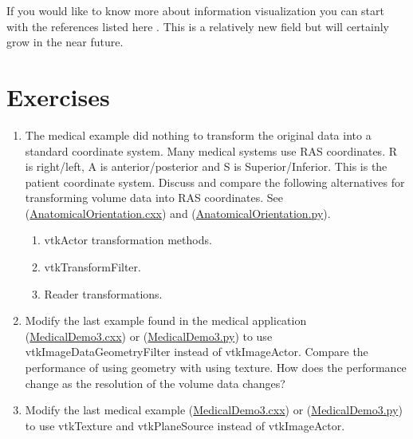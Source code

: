 If you would like to know more about information visualization you can start with the references listed here \cite{Becker95} \cite{Ding90} \cite{Eick93} \cite{Feiner88} \cite{Johnson91} \cite{Robertson91}. This is a relatively new field but will certainly grow in the near future.

\printbibliography

\section{Exercises}
\label{exercises:ch_12}

\begin{enumerate}

	\item The medical example did nothing to transform the original data into a standard coordinate system. Many medical systems use RAS coordinates. R is right/left, A is anterior/posterior and S is Superior/Inferior. This is the patient coordinate system. Discuss and compare the following alternatives for transforming volume data into RAS coordinates. See (\href{https://lorensen.github.io/VTKExamples/site/Cxx/VisualizationAlgorithms/AnatomicalOrientation/}{AnatomicalOrientation.cxx}) and (\href{https://lorensen.github.io/VTKExamples/site/Python/VisualizationAlgorithms/AnatomicalOrientation/}{AnatomicalOrientation.py}).
	\begin{enumerate}
		\item vtkActor transformation methods.
		\item vtkTransformFilter.
		\item Reader transformations.
	\end{enumerate}

	\item Modify the last example found in the medical application (\href{https://lorensen.github.io/VTKExamples/site/Cxx/Medical/MedicalDemo3/}{MedicalDemo3.cxx}) or (\href{https://lorensen.github.io/VTKExamples/site/Python/Medical/MedicalDemo3/}{MedicalDemo3.py}) to use vtkImageDataGeometryFilter instead of
	vtkImageActor. Compare the performance of using geometry with using
	texture. How does the performance change as the resolution of the
	volume data changes?

	\item Modify the last medical example (\href{https://lorensen.github.io/VTKExamples/site/Cxx/Medical/MedicalDemo3/}{MedicalDemo3.cxx}) or (\href{https://lorensen.github.io/VTKExamples/site/Python/Medical/MedicalDemo3/}{MedicalDemo3.py}) to use vtkTexture and vtkPlaneSource instead of vtkImageActor.


\end{enumerate}
